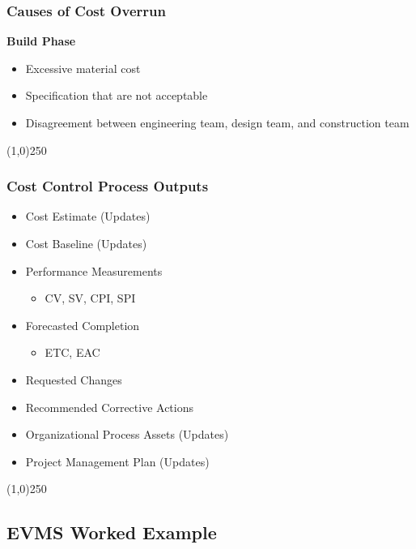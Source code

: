 \begin{frame}
\frametitle{Causes of Cost Overrun}
\textbf{Build Phase}
\begin{itemize}
	\item Excessive material cost
	\item Specification that are not acceptable
	\item Disagreement between engineering team, design team, and construction team
\end{itemize}
\end{frame}
\begin{center}\line(1,0){250}\end{center}






\begin{frame}
\frametitle{Cost Control Process \hfill Outputs}
\begin{itemize}
	\item Cost Estimate (Updates)
	\item Cost Baseline (Updates)
	\item Performance Measurements
		\begin{itemize}
			\item CV, SV, CPI, SPI
		\end{itemize}
	\item Forecasted Completion
		\begin{itemize}
			\item ETC, EAC
		\end{itemize}
	\item Requested Changes
	\item Recommended Corrective Actions
	\item Organizational Process Assets (Updates)
	\item Project Management Plan (Updates)
\end{itemize}
\end{frame}
\begin{center}\line(1,0){250}\end{center}







\subsection{EVMS Worked Example}




